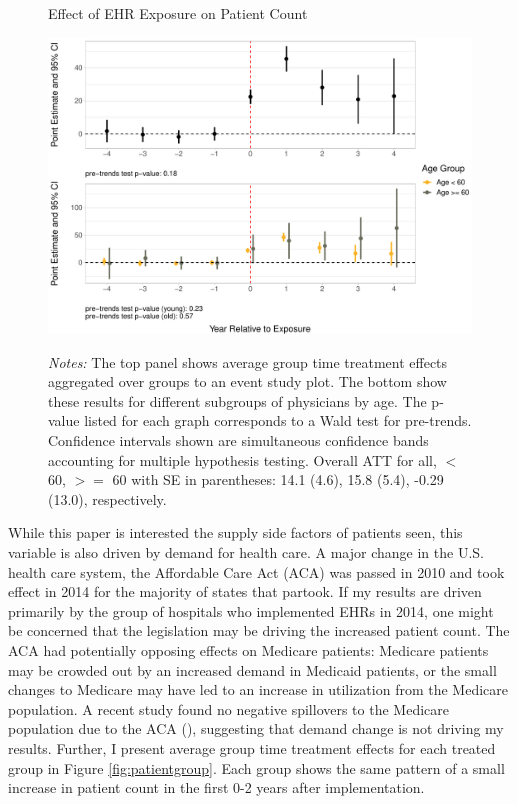 \documentclass[12pt]{article}
\begin{document}
\begin{figure}[ht]
    \centering
    \captionsetup{width=.85\linewidth}
    \caption{Effect of EHR Exposure on Patient Count}
    \includegraphics[scale=.6]{Objects/patient_plot.pdf}
    \label{fig:patient}
    \vspace{2mm}
    \caption*{\footnotesize{\textit{Notes:} The top panel shows average group time treatment effects aggregated over groups to an event study plot. The bottom show these results for different subgroups of physicians by age. The p-value listed for each graph corresponds to a Wald test for pre-trends. Confidence intervals shown are simultaneous confidence bands accounting for multiple hypothesis testing. Overall ATT for all, $<$ 60, $>=$ 60 with SE in parentheses: 14.1 (4.6), 15.8 (5.4), -0.29 (13.0), respectively.}}
\end{figure}

While this paper is interested the supply side factors of patients seen, this variable is also driven by demand for health care. A major change in the U.S. health care system, the Affordable Care Act (ACA) was passed in 2010 and took effect in 2014 for the majority of states that partook. If my results are driven primarily by the group of hospitals who implemented EHRs in 2014, one might be concerned that the legislation may be driving the increased patient count. The ACA had potentially opposing effects on Medicare patients: Medicare patients may be crowded out by an increased demand in Medicaid patients, or the small changes to Medicare may have led to an increase in utilization from the Medicare population. A recent study found no negative spillovers to the Medicare population due to the ACA (\cite{carey2020impact}), suggesting that demand change is not driving my results. Further, I present average group time treatment effects for each treated group in Figure \ref{fig:patientgroup}. Each group shows the same pattern of a small increase in patient count in the first 0-2 years after implementation. 
\end{document}

